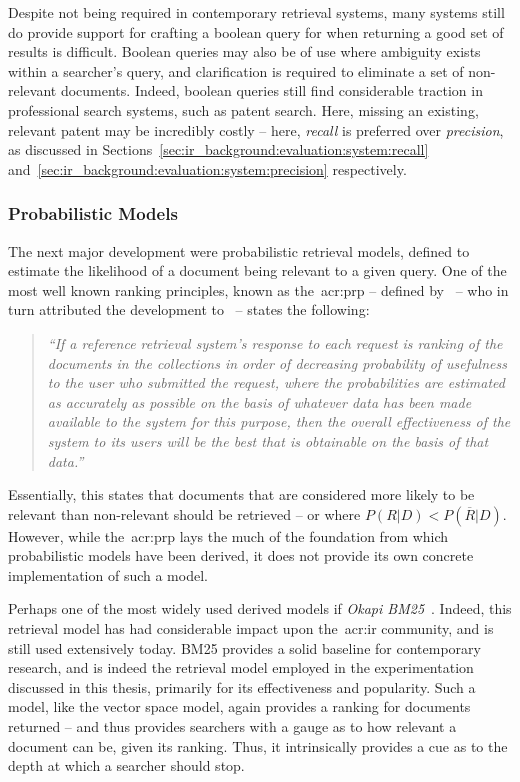 Despite not being required in contemporary retrieval systems, many systems still do provide support for crafting a boolean query for when returning a good set of results is difficult. Boolean queries may also be of use where ambiguity exists within a searcher's query, and clarification is required to eliminate a set of non-relevant documents. Indeed, boolean queries still find considerable traction in professional search systems, such as patent search. Here, missing an existing, relevant patent may be incredibly costly -- here, \emph{recall} is preferred over \emph{precision}, as discussed in Sections~\ref{sec:ir_background:evaluation:system:recall} and~\ref{sec:ir_background:evaluation:system:precision} respectively.

\subsubsection{Probabilistic Models}\label{sec:ir_background:basics:models:probabilistic}
The next major development were probabilistic retrieval models, defined to estimate the likelihood of a document being relevant to a given query. One of the most well known ranking principles, known as the~\gls{acr:prp} -- defined by~\cite{robertson1977prp} -- who in turn attributed the development to~\cite{cooper1971relevance} -- states the following:

\begin{quote}
\emph{``If a reference retrieval system's response to each request is ranking of the documents in the collections in order of decreasing probability of usefulness to the user who submitted the request, where the probabilities are estimated as accurately as possible on the basis of whatever data has been made available to the system for this purpose, then the overall effectiveness of the system to its users will be the best that is obtainable on the basis of that data.''}
\end{quote}

Essentially, this states that documents that are considered more likely to be relevant than non-relevant should be retrieved -- or where $P(R|D) < P(\overline{R}|D)$. However, while the~\gls{acr:prp} lays the much of the foundation from which probabilistic models have been derived, it does not provide its own concrete implementation of such a model.

Perhaps one of the most widely used derived models if \emph{Okapi BM25}~\citep{robertson1995trec3}. Indeed, this retrieval model has had considerable impact upon the~\gls{acr:ir} community, and is still used extensively today. BM25 provides a solid baseline for contemporary research, and is indeed the retrieval model employed in the experimentation discussed in this thesis, primarily for its effectiveness and popularity. Such a model, like the vector space model, again provides a ranking for documents returned -- and thus provides searchers with a gauge as to how relevant a document can be, given its ranking. Thus, it intrinsically provides a cue as to the depth at which a searcher should stop.

